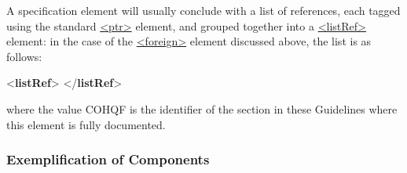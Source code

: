 A specification element will usually conclude with a list of references, each tagged using the standard \hyperref[TEI.ptr]{<ptr>} element, and grouped together into a \hyperref[TEI.listRef]{<listRef>} element: in the case of the \hyperref[TEI.foreign]{<foreign>} element discussed above, the list is as follows: \par\bgroup{}\exampleFont \begin{shaded}\noindent\mbox{}{<\textbf{listRef}>}\mbox{}\newline 
{}\mbox{}\newline 
{</\textbf{listRef}>}\end{shaded}\egroup\par \noindent  where the value COHQF is the identifier of the section in these Guidelines where this element is fully documented.
\subsubsection[{Exemplification of Components}]{Exemplification of Components}\label{TDeg}\par

